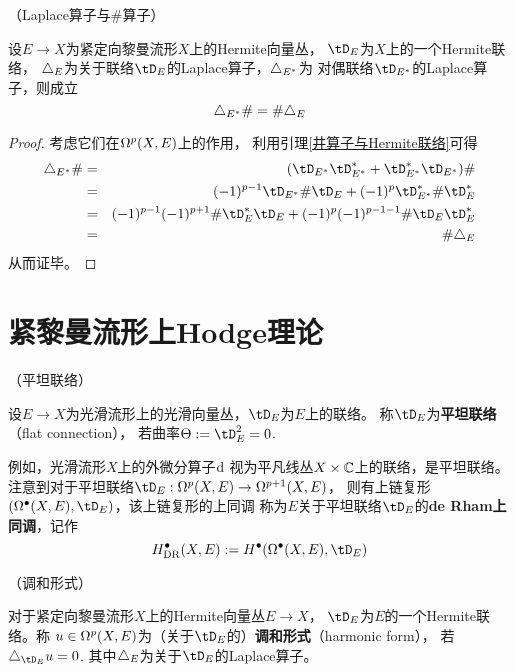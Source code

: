 \begin{lemma}（Laplace算子与$\#$算子）
\label{井算子与Lapalce算子-lemma}

设$E\to X$为紧定向黎曼流形$X$上的Hermite向量丛，
$\tD_E$为$X$上的一个Hermite联络，
$\triangle_E$为关于联络$\tD_E$的Laplace算子，$\triangle_{E^*}$为
对偶联络$\tD_{E^*}$的Laplace算子，则成立
$$\triangle_{E^*}\#=\#\triangle_E$$
\end{lemma}

\begin{proof}
考虑它们在$\Omega^p(X,E)$上的作用，
利用引理\ref{井算子与Hermite联络}可得
\begin{eqnarray*}
     \yc_{E^*}\#
&=&
     (\tD_{E^*}\tD_{E^*}^*+\tD_{E^*}^*\tD_{E^*})\#\\
&=&
     (-1)^{p-1}
     \tD_{E^*}\#\tD_E
    +(-1)^p
     \tD_{E^*}^*\#\tD_E^*\\
&=&
     (-1)^{p-1}(-1)^{p+1}
     \#\tD_E^*\tD_E
    +(-1)^p(-1)^{p-1-1}
     \#\tD_E\tD_E^*\\
&=&
     \#\yc_E
\end{eqnarray*}
从而证毕。
\end{proof}

\section{紧黎曼流形上Hodge理论}

\begin{definition}（平坦联络）

设$E\to X$为光滑流形上的光滑向量丛，$\tD_E$为$E$上的联络。
称$\tD_E$为\textbf{平坦联络}（flat connection），
若曲率$\Theta:=\tD_E^2=0$.
\end{definition}

例如，光滑流形$X$上的外微分算子$\mathrm{d}$
视为平凡线丛$X\times\mathbb{C}$上的联络，是平坦联络。
注意到对于平坦联络$\tD_E:\Omg^p(X,E)\to\Omg^{p+1}(X,E)$，
则有上链复形$(\Omg\updot(X,E),\tD_E)$，该上链复形的上同调
称为$E$关于平坦联络$\tD_E$的\textbf{de Rham上同调}，记作
$$
  H\updot_{\DR}(X,E)
:=H\updot(\Omg\updot(X,E),\tD_E)
$$

\begin{definition}（调和形式）

对于紧定向黎曼流形$X$上的Hermite向量丛$E\to X$，
$\tD_E$为$E$的一个Hermite联络。称
$u\in\Omega^p(X,E)$为（关于$\tD_E$的）\textbf{调和形式}（harmonic form），
若$\yc_{\tD_E}u=0$.
其中$\triangle_{E}$为关于$\tD_E$的Laplace算子。
\end{definition}

